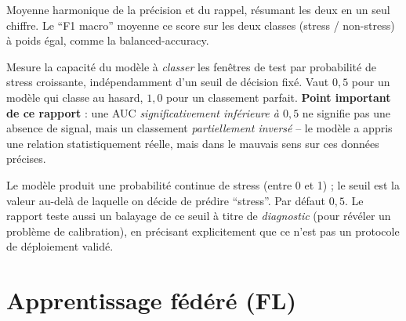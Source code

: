 \documentclass[11pt]{article}
\begin{document}
\begin{description}[leftmargin=0em, style=nextline]
\item[F1-score / F1 macro] Moyenne harmonique de la précision et du rappel, résumant les
deux en un seul chiffre. Le ``F1 macro'' moyenne ce score sur les deux classes (stress /
non-stress) à poids égal, comme la balanced-accuracy.

\item[AUC-ROC (\textit{Area Under the ROC Curve})] Mesure la capacité du modèle à
\emph{classer} les fenêtres de test par probabilité de stress croissante, indépendamment
d'un seuil de décision fixé. Vaut $0{,}5$ pour un modèle qui classe au hasard, $1{,}0$
pour un classement parfait. \textbf{Point important de ce rapport} : une AUC
\emph{significativement inférieure à $0{,}5$} ne signifie pas une absence de signal, mais
un classement \emph{partiellement inversé} -- le modèle a appris une relation
statistiquement réelle, mais dans le mauvais sens sur ces données précises.

\item[Seuil de décision (\textit{threshold})] Le modèle produit une probabilité continue
de stress (entre 0 et 1) ; le seuil est la valeur au-delà de laquelle on décide de
prédire ``stress''. Par défaut $0{,}5$. Le rapport teste aussi un balayage de ce seuil à
titre de \emph{diagnostic} (pour révéler un problème de calibration), en précisant
explicitement que ce n'est pas un protocole de déploiement validé.

\end{description}

\section{Apprentissage fédéré (FL)}
\end{document}
